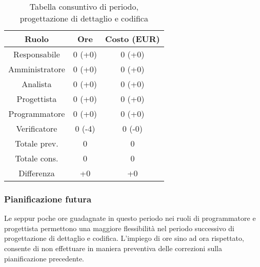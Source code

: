 \begin{table}[h]
	\caption{Tabella consuntivo di periodo, progettazione di dettaglio e codifica}  
	\begin{center}
		\begin{tabular}{ |c|c|c|  }
			\hline
			Ruolo 		& Ore & Costo (EUR)\\
			\hline\hline
			Responsabile	& 0 (+0) & 0 (+0)\\
			Amministratore	& 0 (+0) & 0 (+0)\\
			Analista		& 0 (+0) & 0 (+0)\\
			Progettista		& 0 (+0) & 0 (+0)\\
			Programmatore	& 0 (+0) & 0 (+0)\\
			Verificatore	& 0 (-4) & 0 (-0)\\
			\hline\hline
			Totale prev.	& 0 & 0 \\
			Totale cons.	& 0 & 0 \\
			Differenza		& +0 & +0 \\
			\hline
		\end{tabular}
	\end{center}
\end{table}

\subsubsection{Pianificazione futura}
Le seppur poche ore guadagnate in questo periodo nei ruoli di programmatore e progettista permettono una maggiore flessibilità nel periodo successivo di progettazione di dettaglio e codifica. L'impiego di ore sino ad ora rispettato, consente di non effettuare in maniera preventiva delle correzioni sulla pianificazione precedente. 
